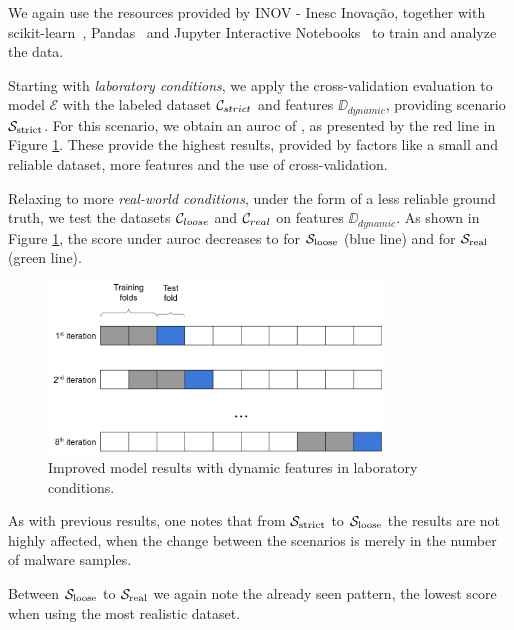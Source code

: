 We again use the resources provided by INOV - Inesc Inovação, together with scikit-learn~\cite{tool:sklearn}, Pandas~\cite{tool:pandas} and Jupyter Interactive Notebooks~\cite{tool:jupyter} to train and analyze the data.

\medskip

Starting with \textit{laboratory conditions}, we apply the cross-validation evaluation to model $\mathcal{E}$ with the labeled dataset $\mathcal{C}_{strict}$ and features $\DD_{dynamic}$, providing scenario $\mathcal{S}_{\mathrm{strict}}$.
For this scenario, we obtain an \gls{auroc} of , as presented by the red line in Figure \ref{fig:improved_xval}.
These provide the highest results, provided by factors like a small and reliable dataset, more features and the use of cross-validation.

Relaxing to more \textit{real-world conditions}, under the form of a less reliable ground truth, we test the datasets $\mathcal{C}_{loose}$ and $\mathcal{C}_{real}$ on features $\DD_{dynamic}$.
As shown in Figure \ref{fig:improved_xval}, the score under \gls{auroc} decreases to  for $\mathcal{S}_{\mathrm{loose}}$ (blue line) and  for $\mathcal{S}_{\mathrm{real}}$ (green line).

\begin{figure}[!h]
	\centering
	\includegraphics[width=0.8\textwidth]{Figures/dia_slidingwindow.png}
	\caption{Improved model results with dynamic features in laboratory conditions.}
	\label{fig:improved_xval}
\end{figure}


As with previous results, one notes that from $\mathcal{S}_{\mathrm{strict}}$ to $\mathcal{S}_{\mathrm{loose}}$ the results are not highly affected, when the change between the scenarios is merely in the number of malware samples.

Between $\mathcal{S}_{\mathrm{loose}}$ to $\mathcal{S}_{\mathrm{real}}$ we again note the already seen pattern, the lowest score when using the most realistic dataset.

